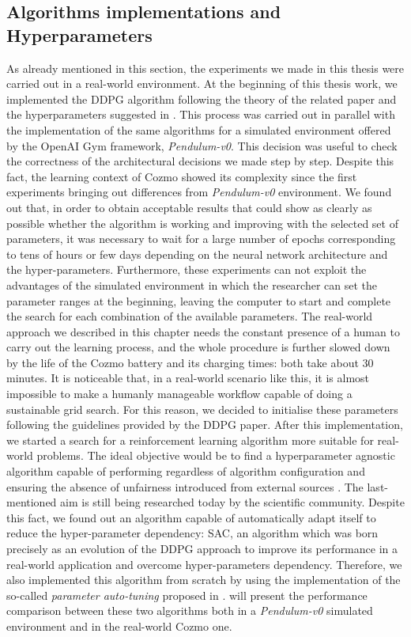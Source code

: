 \subsection{Algorithms implementations and Hyperparameters}

As already mentioned in this section, the experiments we made in this thesis were carried out in a real-world environment.
At the beginning of this thesis work, we implemented the DDPG algorithm following the theory of the related paper and the hyperparameters suggested in \cite{lillicrap2015continuous,kendall2018learning,kendall2019learning}.
This process was carried out in parallel with the implementation of the same algorithms for a simulated environment offered by the OpenAI Gym framework, \textit{Pendulum-v0}.
This decision was useful to check the correctness of the architectural decisions we made step by step.
Despite this fact, the learning context of Cozmo showed its complexity since the first experiments bringing out differences from \textit{Pendulum-v0} environment.
We found out that, in order to obtain acceptable results that could show as clearly as possible whether the algorithm is working and improving with the selected set of parameters, it was necessary to wait for a large number of epochs corresponding to tens of hours or few days depending on the neural network architecture and the hyper-parameters.
Furthermore, these experiments can not exploit the advantages of the simulated environment in which the researcher can set the parameter ranges at the beginning, leaving the computer to start and complete the search for each combination of the available parameters.
The real-world approach we described in this chapter needs the constant presence of a human to carry out the learning process, and the whole procedure is further slowed down by the life of the Cozmo battery and its charging times: both take about 30 minutes.
It is noticeable that, in a real-world scenario like this, it is almost impossible to make a humanly manageable workflow capable of doing a sustainable grid search.
For this reason, we decided to initialise these parameters following the guidelines provided by the DDPG paper.
After this implementation, we started a search for a reinforcement learning algorithm more suitable for real-world problems.
The ideal objective would be to find a hyperparameter agnostic algorithm capable of performing regardless of algorithm configuration and ensuring the absence of unfairness introduced from external sources \cite{henderson2018deep}.
The last-mentioned aim is still being researched today by the scientific community.
Despite this fact, we found out an algorithm capable of automatically adapt itself to reduce the hyper-parameter dependency: SAC, an algorithm which was born precisely as an evolution of the DDPG approach to improve its performance in a real-world application and overcome hyper-parameters dependency.
Therefore, we also implemented this algorithm from scratch by using the implementation of the so-called \textit{parameter auto-tuning} proposed in \cite{haarnoja2018soft, haarnoja2018alg}.
 will present the performance comparison between these two algorithms both in a \textit{Pendulum-v0} simulated environment and in the real-world Cozmo one.

